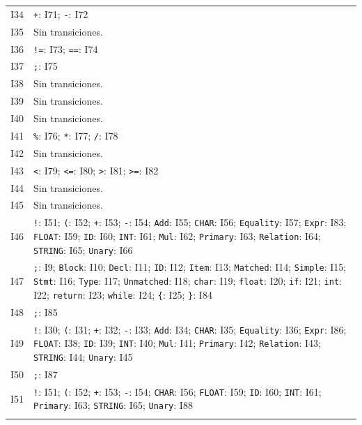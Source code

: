{\begin{longtable}{@{}r p{14.7cm}@{}}
I34 & \texttt{+}: I71; \texttt{-}: I72\\\addlinespace[3pt]
I35 & Sin transiciones.\\\addlinespace[3pt]
I36 & \texttt{!=}: I73; \texttt{==}: I74\\\addlinespace[3pt]
I37 & \texttt{;}: I75\\\addlinespace[3pt]
I38 & Sin transiciones.\\\addlinespace[3pt]
I39 & Sin transiciones.\\\addlinespace[3pt]
I40 & Sin transiciones.\\\addlinespace[3pt]
I41 & \texttt{\%}: I76; \texttt{*}: I77; \texttt{/}: I78\\\addlinespace[3pt]
I42 & Sin transiciones.\\\addlinespace[3pt]
I43 & \texttt{\textless{}}: I79; \texttt{\textless{}=}: I80; \texttt{\textgreater{}}: I81; \texttt{\textgreater{}=}: I82\\\addlinespace[3pt]
I44 & Sin transiciones.\\\addlinespace[3pt]
I45 & Sin transiciones.\\\addlinespace[3pt]
I46 & \texttt{!}: I51; \texttt{(}: I52; \texttt{+}: I53; \texttt{-}: I54; \texttt{Add}: I55; \texttt{CHAR}: I56; \texttt{Equality}: I57; \texttt{Expr}: I83; \texttt{FLOAT}: I59; \texttt{ID}: I60; \texttt{INT}: I61; \texttt{Mul}: I62; \texttt{Primary}: I63; \texttt{Relation}: I64; \texttt{STRING}: I65; \texttt{Unary}: I66\\\addlinespace[3pt]
I47 & \texttt{;}: I9; \texttt{Block}: I10; \texttt{Decl}: I11; \texttt{ID}: I12; \texttt{Item}: I13; \texttt{Matched}: I14; \texttt{Simple}: I15; \texttt{Stmt}: I16; \texttt{Type}: I17; \texttt{Unmatched}: I18; \texttt{char}: I19; \texttt{float}: I20; \texttt{if}: I21; \texttt{int}: I22; \texttt{return}: I23; \texttt{while}: I24; \texttt{\{}: I25; \texttt{\}}: I84\\\addlinespace[3pt]
I48 & \texttt{;}: I85\\\addlinespace[3pt]
I49 & \texttt{!}: I30; \texttt{(}: I31; \texttt{+}: I32; \texttt{-}: I33; \texttt{Add}: I34; \texttt{CHAR}: I35; \texttt{Equality}: I36; \texttt{Expr}: I86; \texttt{FLOAT}: I38; \texttt{ID}: I39; \texttt{INT}: I40; \texttt{Mul}: I41; \texttt{Primary}: I42; \texttt{Relation}: I43; \texttt{STRING}: I44; \texttt{Unary}: I45\\\addlinespace[3pt]
I50 & \texttt{;}: I87\\\addlinespace[3pt]
I51 & \texttt{!}: I51; \texttt{(}: I52; \texttt{+}: I53; \texttt{-}: I54; \texttt{CHAR}: I56; \texttt{FLOAT}: I59; \texttt{ID}: I60; \texttt{INT}: I61; \texttt{Primary}: I63; \texttt{STRING}: I65; \texttt{Unary}: I88\\\addlinespace[3pt]

\end{longtable}}
